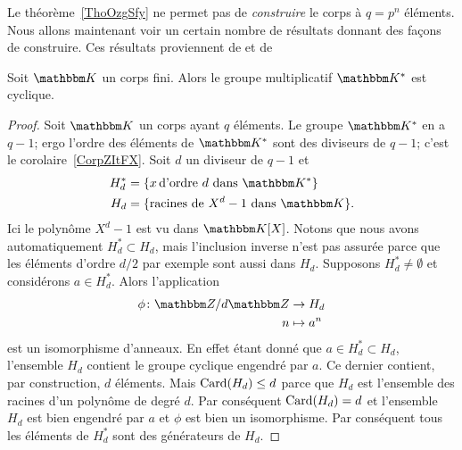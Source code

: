Le théorème~\ref{ThoOzgSfy} ne permet pas de \emph{construire} le corps à \( q=p^n\) éléments. Nous allons maintenant voir un certain nombre de résultats donnant des façons de construire. Ces résultats proviennent de \cite{MichelMerlecorpsfinis,GabrielPeyre,RodierCorpsFinis} et de 

\begin{proposition}     \label{PropnfebjI}
    Soit \( \eK\) un corps fini. Alors le groupe multiplicatif \( \eK^*\) est cyclique.
\end{proposition}

\begin{proof}
    Soit \( \eK\) un corps ayant \( q\) éléments. Le groupe \( \eK^*\) en a \( q-1\); ergo l'ordre des éléments de \( \eK^*\) sont des diviseurs de \( q-1\); c'est le corolaire~\ref{CorpZItFX}. Soit \( d\) un diviseur de \( q-1\) et
    \begin{subequations}
        \begin{align}
            H^*_d&=\{ x\,\text{d'ordre } d\text{ dans } \eK^* \}\\
            H_d&=\{ \text{racines de } X^d-1\text{ dans } \eK \}.
        \end{align}
    \end{subequations}
    Ici le polynôme \( X^d-1\) est vu dans \( \eK[X]\). Notons que nous avons automatiquement \( H^*_d\subset H_d\), mais l'inclusion inverse n'est pas assurée parce que les éléments d'ordre \( d/2\) par exemple sont aussi dans \( H_d\). Supposons \( H^*_d\neq \emptyset\) et considérons \( a\in H^*_d\). Alors l'application
    \begin{equation}
        \begin{aligned}
            \phi\colon \eZ/d\eZ&\to H_d \\
            n&\mapsto a^n
        \end{aligned}
    \end{equation}
    est un isomorphisme d'anneaux. En effet étant donné que \( a\in H^*_d\subset H_d\), l'ensemble \( H_d\) contient le groupe cyclique engendré par \( a\). Ce dernier contient, par construction, \( d\) éléments. Mais \( \operatorname{Card}(H_d)\leq d\) parce que \( H_d\) est l'ensemble des racines d'un polynôme de degré \( d\). Par conséquent \( \operatorname{Card}(H_d)=d\) et l'ensemble \( H_d\) est bien engendré par \( a\) et \( \phi\) est bien un isomorphisme. Par conséquent tous les éléments de \( H^*_d\) sont des générateurs de \( H_d\).


\end{proof}
